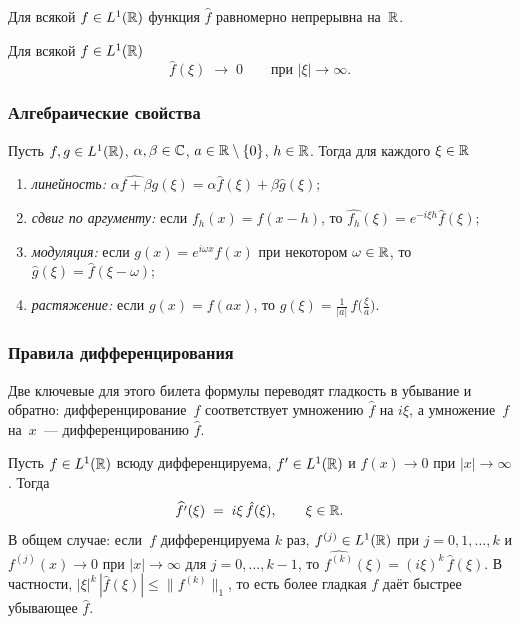 \begin{theorem}
\label{thm:ft-continuous}
Для всякой $f \in L^1(\mathbb{R})$ функция $\hat f$ равномерно непрерывна
на~$\mathbb{R}$.
\end{theorem}

\begin{theorem}
\label{thm:rl-line}
Для всякой $f \in L^1(\mathbb{R})$
\[
  \hat f(\xi) \;\to\; 0 \qquad \text{при } |\xi| \to \infty.
\]
\end{theorem}

\subsubsection*{Алгебраические свойства}

\begin{proposition}
\label{prop:ft-algebra}
Пусть $f, g \in L^1(\mathbb{R})$, $\alpha, \beta \in \mathbb{C}$,
$a \in \mathbb{R} \setminus \{0\}$, $h \in \mathbb{R}$. Тогда для каждого $\xi \in \mathbb{R}$
\begin{enumerate}[label=(\alph*)]
  \item \emph{линейность:} $\widehat{\alpha f + \beta g}(\xi) = \alpha \hat f(\xi) + \beta \hat g(\xi)$;
  \item \emph{сдвиг по аргументу:} если $f_h(x) = f(x - h)$, то $\widehat{f_h}(\xi) = e^{-i \xi h} \hat f(\xi)$;
  \item \emph{модуляция:} если $g(x) = e^{i \omega x} f(x)$ при некотором $\omega \in \mathbb{R}$, то $\hat g(\xi) = \hat f(\xi - \omega)$;
  \item \emph{растяжение:} если $g(x) = f(a x)$, то $\hat g(\xi) = \tfrac{1}{|a|}\, \hat f\!\bigl(\tfrac{\xi}{a}\bigr)$.
\end{enumerate}
\end{proposition}

\subsubsection*{Правила дифференцирования}

Две ключевые для этого билета формулы переводят гладкость в убывание и
обратно: дифференцирование~$f$ соответствует умножению $\hat f$ на
$i\xi$, а умножение~$f$ на~$x$~--- дифференцированию $\hat f$.

\begin{theorem}
\label{thm:ft-of-derivative}
Пусть $f \in L^1(\mathbb{R})$ всюду дифференцируема, $f' \in L^1(\mathbb{R})$ и
$f(x) \to 0$ при $|x| \to \infty$. Тогда
\[
  \widehat{f'}(\xi) \;=\; i \xi \, \hat f(\xi), \qquad \xi \in \mathbb{R}.
\]
В общем случае: если~$f$ дифференцируема $k$ раз,
$f^{(j)} \in L^1(\mathbb{R})$ при $j = 0, 1, \dots, k$ и
$f^{(j)}(x) \to 0$ при $|x| \to \infty$ для $j = 0, \dots, k - 1$, то
$\widehat{f^{(k)}}(\xi) = (i\xi)^k \, \hat f(\xi)$. В частности,
$|\xi|^k\, |\hat f(\xi)| \leq \|f^{(k)}\|_1$, то есть более гладкая
$f$ даёт быстрее убывающее $\hat f$.
\end{theorem}

